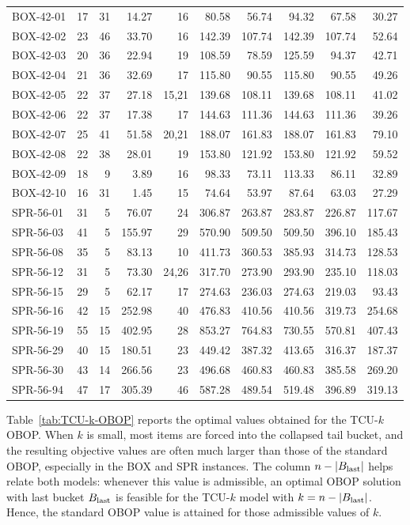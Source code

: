 \documentclass[pdflatex,basic,Numbered]{jnl}%
\theoremstyle{plain}
\theoremstyle{remark}
\theoremstyle{thmstyleone}%
\theoremstyle{thmstylethree}%
\begin{document}
\begin{longtable}{lrr rr rrrrr}
BOX-42-01 & 17 & 31 & 14.27 & 16 & 80.58 & 56.74 & 94.32 & 67.58 & 30.27 \\
BOX-42-02 & 23 & 46 & 33.70 & 16 & 142.39 & 107.74 & 142.39 & 107.74 & 52.64 \\
BOX-42-03 & 20 & 36 & 22.94 & 19 & 108.59 & 78.59 & 125.59 & 94.37 & 42.71 \\
BOX-42-04 & 21 & 36 & 32.69 & 17 & 115.80 & 90.55 & 115.80 & 90.55 & 49.26 \\
BOX-42-05 & 22 & 37 & 27.18 & 15,21 & 139.68 & 108.11 & 139.68 & 108.11 & 41.02 \\
BOX-42-06 & 22 & 37 & 17.38 & 17 & 144.63 & 111.36 & 144.63 & 111.36 & 39.26 \\
BOX-42-07 & 25 & 41 & 51.58 & 20,21 & 188.07 & 161.83 & 188.07 & 161.83 & 79.10 \\
BOX-42-08 & 22 & 38 & 28.01 & 19 & 153.80 & 121.92 & 153.80 & 121.92 & 59.52 \\
BOX-42-09 & 18 & 9 & 3.89 & 16 & 98.33 & 73.11 & 113.33 & 86.11 & 32.89 \\
BOX-42-10 & 16 & 31 & 1.45 & 15 & 74.64 & 53.97 & 87.64 & 63.03 & 27.29 \\[0.2em]

SPR-56-01 & 31 & 5 & 76.07 & 24 & 306.87 & 263.87 & 283.87 & 226.87 & 117.67 \\
SPR-56-03 & 41 & 5 & 155.97 & 29 & 570.90 & 509.50 & 509.50 & 396.10 & 185.43 \\
SPR-56-08 & 35 & 5 & 83.13 & 10 & 411.73 & 360.53 & 385.93 & 314.73 & 128.53 \\
SPR-56-12 & 31 & 5 & 73.30 & 24,26 & 317.70 & 273.90 & 293.90 & 235.10 & 118.03 \\
SPR-56-15 & 29 & 5 & 62.17 & 17 & 274.63 & 236.03 & 274.63 & 219.03 & 93.43 \\
SPR-56-16 & 42 & 15 & 252.98 & 40 & 476.83 & 410.56 & 410.56 & 319.73 & 254.68 \\
SPR-56-19 & 55 & 15 & 402.95 & 28 & 853.27 & 764.83 & 730.55 & 570.81 & 407.43 \\
SPR-56-29 & 40 & 15 & 180.51 & 23 & 449.42 & 387.32 & 413.65 & 316.37 & 187.37 \\
SPR-56-30 & 43 & 14 & 266.56 & 23 & 496.68 & 460.83 & 460.83 & 385.58 & 269.20 \\
SPR-56-94 & 47 & 17 & 305.39 & 46 & 587.28 & 489.54 & 519.48 & 396.89 & 319.13 \\

\end{longtable}
\endgroup

Table~\ref{tab:TCU-k-OBOP} reports the optimal values obtained for the TCU-\(k\) {\rm OBOP}. When \(k\) is small, most items are forced into the collapsed tail bucket, and the resulting objective values are often much larger than those of the standard {\rm OBOP}, especially in the BOX and SPR instances. The column \(n-|B_{\rm last}|\) helps relate both models: whenever this value is admissible, an optimal {\rm OBOP} solution with last bucket \(B_{\rm last}\) is feasible for the TCU-\(k\) model with \(k=n-|B_{\rm last}|\). Hence, the standard {\rm OBOP} value is attained for those admissible values of \(k\).
\end{document}
